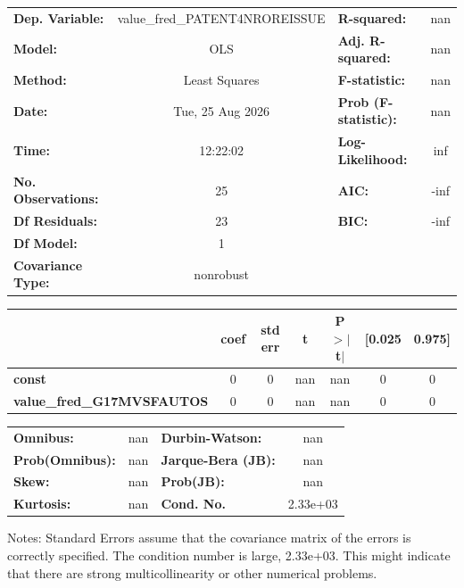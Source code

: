 \begin{center}
\begin{tabular}{lclc}
\toprule
\textbf{Dep. Variable:}            & value\_fred\_PATENT4NROREISSUE & \textbf{  R-squared:         } &       nan   \\
\textbf{Model:}                    &              OLS               & \textbf{  Adj. R-squared:    } &       nan   \\
\textbf{Method:}                   &         Least Squares          & \textbf{  F-statistic:       } &       nan   \\
\textbf{Date:}                     &        Tue, 25 Aug 2026        & \textbf{  Prob (F-statistic):} &      nan    \\
\textbf{Time:}                     &            12:22:02            & \textbf{  Log-Likelihood:    } &       inf   \\
\textbf{No. Observations:}         &                 25             & \textbf{  AIC:               } &      -inf   \\
\textbf{Df Residuals:}             &                 23             & \textbf{  BIC:               } &      -inf   \\
\textbf{Df Model:}                 &                  1             & \textbf{                     } &             \\
\textbf{Covariance Type:}          &           nonrobust            & \textbf{                     } &             \\
\bottomrule
\end{tabular}
\begin{tabular}{lcccccc}
                                   & \textbf{coef} & \textbf{std err} & \textbf{t} & \textbf{P$> |$t$|$} & \textbf{[0.025} & \textbf{0.975]}  \\
\midrule
\textbf{const}                     &            0  &            0     &       nan  &           nan        &            0    &            0     \\
\textbf{value\_fred\_G17MVSFAUTOS} &            0  &            0     &       nan  &           nan        &            0    &            0     \\
\bottomrule
\end{tabular}
\begin{tabular}{lclc}
\textbf{Omnibus:}       &    nan & \textbf{  Durbin-Watson:     } &      nan  \\
\textbf{Prob(Omnibus):} &    nan & \textbf{  Jarque-Bera (JB):  } &      nan  \\
\textbf{Skew:}          &    nan & \textbf{  Prob(JB):          } &      nan  \\
\textbf{Kurtosis:}      &    nan & \textbf{  Cond. No.          } & 2.33e+03  \\
\bottomrule
\end{tabular}
\end{center}

Notes: \newline
 [1] Standard Errors assume that the covariance matrix of the errors is correctly specified. \newline
 [2] The condition number is large, 2.33e+03. This might indicate that there are \newline
 strong multicollinearity or other numerical problems.